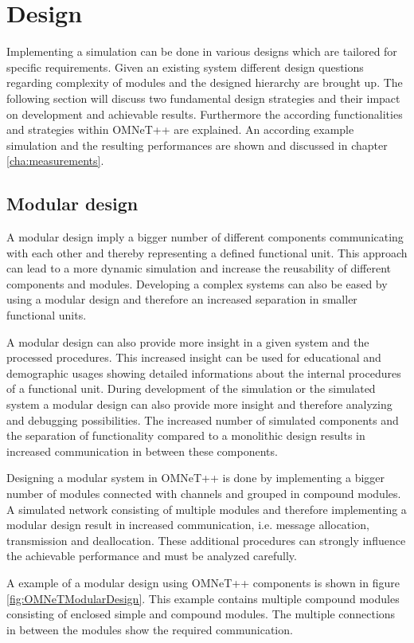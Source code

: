 \chapter{Design}
\label{cha:design}
Implementing a simulation can be done in various designs which are tailored for specific requirements.
Given an existing system different design questions regarding complexity of modules and the designed hierarchy are brought up.
The following section will discuss two fundamental design strategies and their impact on development and achievable results.
Furthermore the according functionalities and strategies within OMNeT++ are explained.
An according example simulation and the resulting performances are shown and discussed in chapter \ref{cha:measurements}.

\section{Modular design}
\label{sec:design_modular}
A modular design imply a bigger number of different components communicating with each other and thereby representing a defined functional unit.
This approach can lead to a more dynamic simulation and increase the reusability of different components and modules.
Developing a complex systems can also be eased by using a modular design and therefore an increased separation in smaller functional units.

A modular design can also provide more insight in a given system and the processed procedures.
This increased insight can be used for educational and demographic usages showing detailed informations about the internal procedures of a functional unit.
During development of the simulation or the simulated system a modular design can also provide more insight and therefore analyzing and debugging possibilities.
The increased number of simulated components and the separation of functionality compared to a monolithic design results in increased communication in between these components.

Designing a modular system in OMNeT++ is done by implementing a bigger number of modules connected with channels and grouped in compound modules.
A simulated network consisting of multiple modules and therefore implementing a modular design result in increased communication, i.e. message allocation, transmission and deallocation.
These additional procedures can strongly influence the achievable performance and must be analyzed carefully.

A example of a modular design using OMNeT++ components is shown in figure \ref{fig:OMNeTModularDesign}.
This example contains multiple compound modules consisting of enclosed simple and compound modules.
The multiple connections in between the modules show the required communication.

